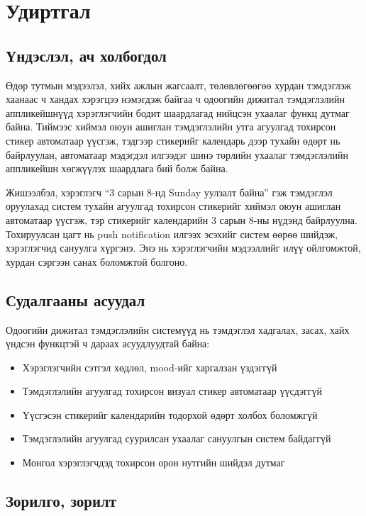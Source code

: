 \chapter{Удиртгал}
\label{ch:intro}

\section{Үндэслэл, ач холбогдол}

Өдөр тутмын мэдээлэл, хийх ажлын жагсаалт, төлөвлөгөөгөө хурдан тэмдэглэж хаанаас ч
хандах хэрэгцээ нэмэгдэж байгаа ч одоогийн дижитал тэмдэглэлийн аппликейшнүүд
хэрэглэгчийн бодит шаардлагад нийцсэн ухаалаг функц дутмаг байна. Тиймээс хиймэл оюун
ашиглан тэмдэглэлийн утга агуулгад тохирсон стикер автоматаар үүсгэж, тэдгээр стикерийг
календарь дээр тухайн өдөрт нь байрлуулан, автоматаар мэдэгдэл илгээдэг шинэ төрлийн
ухаалаг тэмдэглэлийн аппликейшн хөгжүүлэх шаардлага бий болж байна.

Жишээлбэл, хэрэглэгч ``3 сарын 8-нд Sunday уулзалт байна'' гэж тэмдэглэл оруулахад систем
тухайн агуулгад тохирсон стикерийг хиймэл оюун ашиглан автоматаар үүсгэж, тэр стикерийг
календарийн 3 сарын 8-ны нүдэнд байрлуулна. Тохируулсан цагт нь push notification
илгээх эсэхийг систем өөрөө шийдэж, хэрэглэгчид сануулга хүргэнэ. Энэ нь хэрэглэгчийн
мэдээллийг илүү ойлгомжтой, хурдан сэргээн санах боломжтой болгоно.

\section{Судалгааны асуудал}

Одоогийн дижитал тэмдэглэлийн системүүд нь тэмдэглэл хадгалах, засах, хайх үндсэн
функцтэй ч дараах асуудлуудтай байна:
\begin{itemize}
  \item Хэрэглэгчийн сэтгэл хөдлөл, mood-ийг харгалзан үздэггүй
  \item Тэмдэглэлийн агуулгад тохирсон визуал стикер автоматаар үүсдэггүй
  \item Үүсгэсэн стикерийг календарийн тодорхой өдөрт холбох боломжгүй
  \item Тэмдэглэлийн агуулгад суурилсан ухаалаг сануулгын систем байдаггүй
  \item Монгол хэрэглэгчдэд тохирсон орон нутгийн шийдэл дутмаг
\end{itemize}

\section{Зорилго, зорилт}

